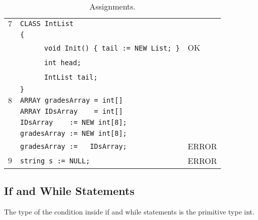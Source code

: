 \documentclass{article}
\begin{document}
\begin{table}[h]
\begin{tabular}{|l|l|l|}
 $7$ & \verb"CLASS IntList"                            &    \\
     & \verb"{"                                        &    \\
     & ~ ~ ~ ~\verb"void Init() { tail := NEW List; }" & OK \\
     & ~ ~ ~ ~\verb"int head;"                         &    \\
     & ~ ~ ~ ~\verb"IntList tail;"                     &    \\
     & \verb"}"                                        &    \\
\hline
 $8$ & \verb"ARRAY gradesArray = int[]"  &       \\
     & \verb"ARRAY IDsArray    = int[]"  &       \\
     & \verb"IDsArray    := NEW int[8];" &       \\
     & \verb"gradesArray := NEW int[8];" &       \\
     & \verb"gradesArray :=   IDsArray;" & ERROR \\
\hline
 $9$ & \verb"string s := NULL;" & ERROR \\
\hline
\end{tabular}
\caption{Assignments.
\label{Table_Code_Examples_Assignments}}
\end{table}
\newpage
\subsection{If and While Statements}
\label{subsection_If_And_While_Statements}
The type of the condition inside if and while statements is the primitive type int.
\newpage
\end{document}
